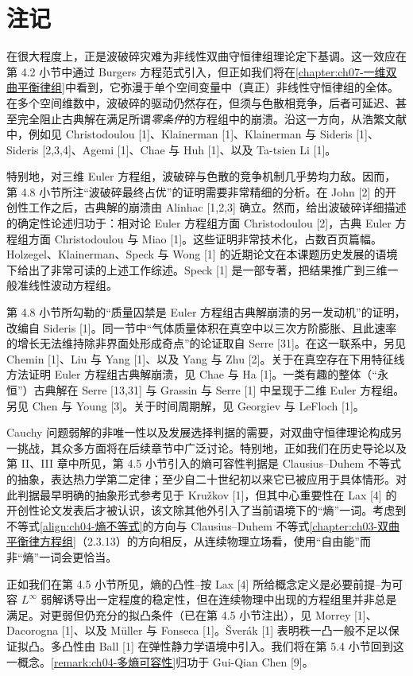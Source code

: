 ﻿\documentclass[../../main.tex]{subfiles}
\begin{document}
\section{注记}\label{section:ch04-注记}

在很大程度上，正是波破碎灾难为非线性双曲守恒律组理论定下基调。这一效应在第 4.2 小节中通过 Burgers 方程范式引入，但正如我们将在\cref{chapter:ch07-一维双曲平衡律组}中看到，它弥漫于单个空间变量中（真正）非线性守恒律组的全体。在多个空间维数中，波破碎的驱动仍然存在，但须与色散相竞争，后者可延迟、甚至完全阻止古典解在满足所谓\emph{零条件}的方程组中的崩溃。沿这一方向，从浩繁文献中，例如见 Christodoulou [1]、Klainerman [1]、Klainerman 与 Sideris [1]、Sideris [2,3,4]、Agemi [1]、Chae 与 Huh [1]、以及 Ta-tsien Li [1]。


特别地，对三维 Euler 方程组，波破碎与色散的竞争机制几乎势均力敌。因而，第 4.8 小节所注“波破碎最终占优”的证明需要非常精细的分析。在 John [2] 的开创性工作之后，古典解的崩溃由 Alinhac [1,2,3] 确立。然而，给出波破碎详细描述的确定性论述归功于：相对论 Euler 方程组方面 Christodoulou [2]，古典 Euler 方程组方面 Christodoulou 与 Miao [1]。这些证明非常技术化，占数百页篇幅。Holzegel、Klainerman、Speck 与 Wong [1] 的近期论文在本课题历史发展的语境下给出了非常可读的上述工作综述。Speck [1] 是一部专著，把结果推广到三维一般准线性波动方程组。

第 4.8 小节所勾勒的“质量囚禁是 Euler 方程组古典解崩溃的另一发动机”的证明，改编自 Sideris [1]。同一节中“气体质量体积在真空中以三次方阶膨胀、且此速率的增长无法维持除非界面处形成奇点”的论证取自 Serre [31]。在这一联系中，另见 Chemin [1]、Liu 与 Yang [1]、以及 Yang 与 Zhu [2]。关于在真空存在下用特征线方法证明 Euler 方程组古典解崩溃，见 Chae 与 Ha [1]。一类有趣的整体（“永恒”）古典解在 Serre [13,31] 与 Grassin 与 Serre [1] 中呈现于二维 Euler 方程组。另见 Chen 与 Young [3]。关于时间周期解，见 Georgiev 与 LeFloch [1]。

Cauchy 问题弱解的非唯一性以及发展选择判据的需要，对双曲守恒律理论构成另一挑战，其众多方面将在后续章节中广泛讨论。特别地，正如我们在历史导论以及第 II、III 章中所见，第 4.5 小节引入的熵可容性判据是 Clausius--Duhem 不等式的抽象，表达热力学第二定律；至少自二十世纪初以来它已被应用于具体情形。对此判据最早明确的抽象形式参考见于 Kružkov [1]，但其中心重要性在 Lax [4] 的开创性论文发表后才被认识，该文除其他外引入了当前语境下的“熵”一词。考虑到不等式\eqref{align:ch04-熵不等式}的方向与 Clausius--Duhem 不等式\cref{chapter:ch03-双曲平衡律方程组}（2.3.13）的方向相反，从连续物理立场看，使用“自由能”而非“熵”一词会更恰当。


正如我们在第 4.5 小节所见，熵的凸性--按 Lax [4] 所给概念定义是必要前提--为可容 $L^{\infty}$ 弱解诱导出一定程度的稳定性，但在连续物理中出现的方程组里并非总是满足。对更弱但仍充分的拟凸条件（已在第 4.5 小节注出），见 Morrey [1]、Dacorogna [1]、以及 Müller 与 Fonseca [1]。Šverák [1] 表明秩一凸一般不足以保证拟凸。多凸性由 Ball [1] 在弹性静力学语境中引入。我们将在第 5.4 小节回到这一概念。\cref{remark:ch04-多熵可容性}归功于 Gui-Qian Chen [9]。
\end{document}
